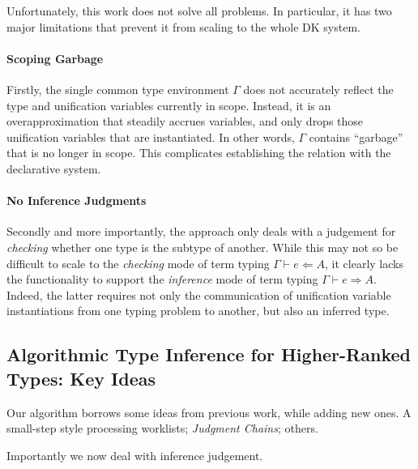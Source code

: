 Unfortunately, this work does not solve all problems. In particular, it has two
major limitations that prevent it from scaling to the whole DK system. 

\paragraph{Scoping Garbage} Firstly, the single common type environment
$\Gamma$ does not accurately reflect the type and unification variables
currently in scope. Instead, it is an overapproximation that steadily accrues
variables, and only drops those unification variables that are instantiated.
In other words, $\Gamma$ contains ``garbage'' that is no longer in scope.
This complicates establishing the relation with the declarative system.


\paragraph{No Inference Judgments} 
Secondly and more importantly, the approach only deals with a judgement for
\emph{checking} whether one type is the subtype of another. While this may not
so be difficult to scale to the \emph{checking} mode of term typing $\Gamma
\vdash e \Leftarrow A$, it clearly lacks the functionality to support the
\emph{inference} mode of term typing $\Gamma \vdash e \Rightarrow A$. Indeed,
the latter requires not only the communication of unification variable
instantiations from one typing problem to another, but also an inferred type.

\subsection{Algorithmic Type Inference for Higher-Ranked Types: Key Ideas}

Our algorithm borrows some ideas from previous work, while adding new ones. 
A small-step style processing worklists; \emph{Judgment Chains}; others. 

Importantly we now deal with inference judgement.


